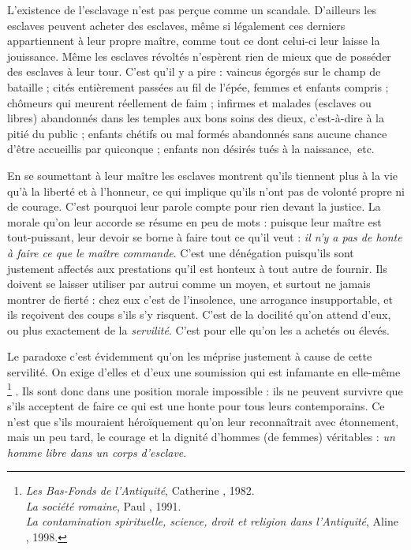  L'existence de l'esclavage n'est pas perçue comme un scandale. D'ailleurs les esclaves peuvent acheter des esclaves, même si légalement ces derniers appartiennent à leur propre maître, comme tout ce dont celui-ci leur laisse la jouissance. Même les esclaves révoltés n'espèrent rien de mieux que de posséder des esclaves à leur tour. C'est qu'il y a pire : vaincus égorgés sur le champ de bataille ; cités entièrement passées au fil de l'épée, femmes et enfants compris ; chômeurs qui meurent réellement de faim ; infirmes et malades (esclaves ou libres) abandonnés dans les temples aux bons soins des dieux, c'est-à-dire à la pitié du public ; enfants chétifs ou mal formés abandonnés sans aucune chance d'être accueillis par quiconque ; enfants non désirés tués à la naissance,~etc.

 En se soumettant à leur maître les esclaves montrent qu'ils tiennent plus à la vie qu'à la liberté et à l'honneur, ce qui implique qu'ils n'ont pas de volonté propre ni de courage. C'est pourquoi leur parole compte pour rien devant la justice. La morale qu'on leur accorde se résume en peu de mots : puisque leur maître est tout-puissant, leur devoir se borne à faire tout ce qu'il veut : \emph{il n'y a pas de honte à faire ce que le maître commande}. C'est une dénégation puisqu'ils sont justement affectés aux prestations qu'il est honteux à tout autre de fournir. Ils doivent se laisser utiliser par autrui comme un moyen, et surtout ne jamais montrer de fierté : chez eux c'est de l'insolence, une arrogance insupportable, et ils reçoivent des coups s'ils s'y risquent. C'est de la docilité qu'on attend d'eux, ou plus exactement de la \emph{servilité}. C'est pour elle qu'on les a achetés ou élevés. 

 Le paradoxe c'est évidemment qu'on les méprise justement à cause de cette servilité. On exige d'elles et d'eux une soumission qui est infamante en elle-même%
\footnote{\emph{Les Bas-Fonds de l'Antiquité}, Catherine , 1982.\\
\emph{La société romaine}, Paul , 1991.\\
\emph{La contamination spirituelle, science, droit et religion dans l'Antiquité}, Aline , 1998.}%
. Ils sont donc dans une position morale impossible : ils ne peuvent survivre que s'ils acceptent de faire ce qui est une honte pour tous leurs contemporains. Ce n'est que s'ils mouraient héroïquement qu'on leur reconnaîtrait avec étonnement, mais un peu tard, le courage et la dignité d'hommes (de femmes) véritables : \emph{un homme libre dans un corps d'esclave}. 


